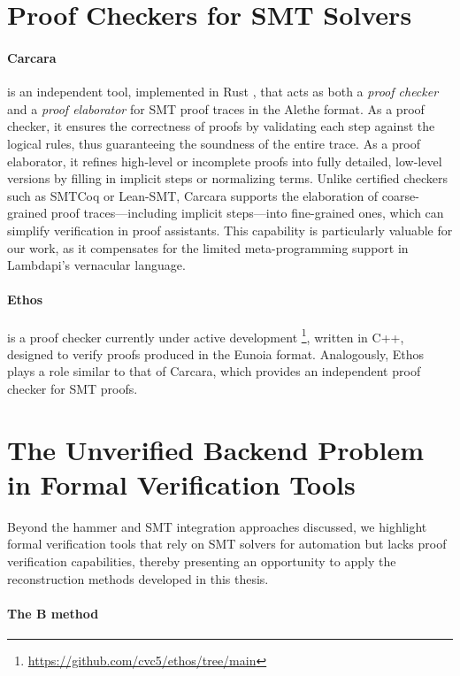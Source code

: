 \section{Proof Checkers for SMT Solvers}

\paragraph{Carcara} \cite{carcara} is an independent tool, implemented in Rust \cite{rust}, that acts as both a \emph{proof checker} and a \emph{proof elaborator} for SMT proof traces in the Alethe format.
As a proof checker, it ensures the correctness of proofs by validating each step against the logical rules, thus guaranteeing the soundness of the entire trace.
As a proof elaborator, it refines high-level or incomplete proofs into fully detailed, low-level versions by filling in implicit steps or normalizing terms.
Unlike certified checkers such as SMTCoq or Lean-SMT, Carcara supports the elaboration of coarse-grained proof traces—including implicit steps—into fine-grained ones, which can simplify verification in proof assistants.
This capability is particularly valuable for our work, as it compensates for the limited meta-programming support in Lambdapi’s vernacular language.

\paragraph{Ethos} is a proof checker currently under active development \footnote{\url{https://github.com/cvc5/ethos/tree/main}}, written in C++, designed to verify proofs produced in the Eunoia format.
Analogously, Ethos plays a role similar to that of Carcara, which provides an independent proof checker for SMT proofs.


\section{The Unverified Backend Problem in Formal Verification Tools}

Beyond the hammer and SMT integration approaches discussed,
we highlight formal verification tools that rely on SMT solvers for automation but lacks proof verification capabilities,
thereby presenting an opportunity to apply the reconstruction methods developed in this thesis.

\paragraph{The B method}

